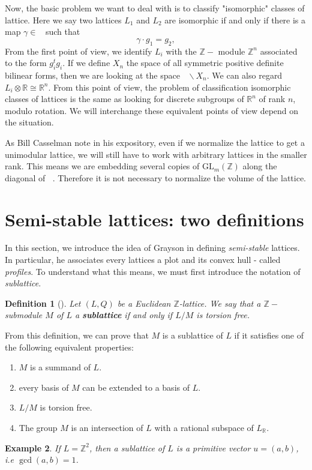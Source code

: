 \documentclass[12pt]{article} %
\newtheorem{definition}{Definition}[section]
\newtheorem{example}[definition]{Example}
\DeclareMathOperator{\slnz}{SL_n(\mathbb{Z})}
\DeclareMathOperator{\glnz}{GL_n(\mathbb{Z})}
\begin{document}
Now, the basic problem we want to deal with is to classify "isomorphic" classes of lattice. Here
we say two lattices $L_1$ and $L_2$ are isomorphic if and only if there is a map $\gamma \in \glnz$ such that
\[\gamma \cdot g_1 = g_2,\]
From the first point of view, we identify $L_i$ with the $\mathbb{Z}-$ module
$\mathbb{Z}^n$ associated to the form $g_i^tg_i$. If we define $X_n$ the space of all
symmetric positive definite bilinear forms, then we are looking at the space $\glnz \backslash X_n$. We can also
regard $L_i \otimes \mathbb{R} \cong \mathbb{R}^n$. From this point of view,
the problem of classification isomorphic classes of lattices is the same as looking for discrete
subgroups of $\mathbb{R}^n$ of rank $n$, modulo rotation. We will interchange these equivalent points of view
depend on the situation.

As Bill Casselman note in his expository, even if we normalize the lattice to get a unimodular
lattice, we will still have to work with arbitrary lattices in the smaller rank. This means we are embedding
several copies of $\text{GL}_m(\mathbb{Z})$ along the diagonal of $\slnz$. Therefore it is not necessary to
normalize the volume of the lattice.
\section{Semi-stable lattices: two definitions}
In this section, we introduce the idea of Grayson in defining \textit{semi-stable} lattices.
In particular, he associates every lattices a plot and its convex hull - called \textit{ profiles}. To understand
what this means, we must first introduce the notation of \textit{sublattice}.
\begin{definition}[\label=sublattice]
    Let $(L,Q)$ be a Euclidean $\mathbb{Z}$-lattice. We say that a $\mathbb{Z}-$submodule $M$ of
    $L$ a \textbf{sublattice} if and only if $L/M$ is torsion free.
\end{definition}
From this definition, we can prove that $M$ is a sublattice of $L$ if it satisfies one of the
following equivalent properties:
\begin{enumerate}
    \item $M$ is a summand of $L$.
    \item every basis of $M$ can be extended to a basis of $L$.
    \item $L/M$ is torsion free.
    \item The group $M$ is an intersection of $L$ with a rational subspace of $L_\mathbb{R}$.
\end{enumerate}
\begin{example}
    If $L = \mathbb{Z}^2$, then a sublattice of $L$ is a primitive vector $u = (a,b)$, i.e
    $\gcd(a,b)=1$.
\end{example}
\end{document}
